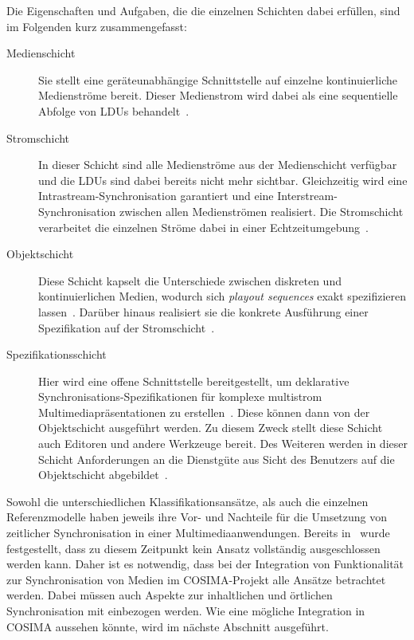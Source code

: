   Die Eigenschaften und Aufgaben, die die einzelnen Schichten dabei erfüllen, sind im Folgenden kurz zusammengefasst:
  
  \begin{description}
    \item[Medienschicht] Sie stellt eine geräteunabhängige Schnittstelle auf einzelne kontinuierliche Medienströme bereit. Dieser Medienstrom wird dabei als eine sequentielle Abfolge von LDUs behandelt~\citep[S. 603]{multimedia_technologie}.
    \item[Stromschicht] In dieser Schicht sind alle Medienströme aus der Medienschicht verfügbar und die LDUs sind dabei bereits nicht mehr sichtbar. Gleichzeitig wird eine Intrastream-Synchronisation garantiert und eine Interstream-Synchronisation zwischen allen Medienströmen realisiert. Die Stromschicht verarbeitet die einzelnen Ströme dabei in einer Echtzeitumgebung~\citep[S. 604]{multimedia_technologie}.
    \item[Objektschicht] Diese Schicht kapselt die Unterschiede zwischen diskreten und kontinuierlichen Medien, wodurch sich \emph{playout sequences} exakt spezifizieren lassen~\citep[S. 99]{meyer1993tms}. Darüber hinaus realisiert sie die konkrete Ausführung einer Spezifikation auf der Stromschicht~\citep[S. 605]{multimedia_technologie}.
    \item[Spezifikationsschicht] Hier wird eine offene Schnittstelle bereitgestellt, um deklarative Synchronisations-Spezifikationen für komplexe multistrom Multimediapräsentationen zu erstellen~\citep[S. 13]{blakowski1996mss}. Diese können dann von der Objektschicht ausgeführt werden. Zu diesem Zweck stellt diese Schicht auch Editoren und andere Werkzeuge bereit. Des Weiteren werden in dieser Schicht Anforderungen an die Dienstgüte aus Sicht des Benutzers auf die Objektschicht abgebildet~\citep[S. 607]{multimedia_technologie}.
  \end{description}
  

  Sowohl die unterschiedlichen Klassifikationsansätze, als auch die einzelnen Referenzmodelle haben jeweils ihre Vor- und Nachteile für die Umsetzung von zeitlicher Synchronisation in einer Multimediaanwendungen. Bereits in~\citep[S. 28ff]{bericht} wurde festgestellt, dass zu diesem Zeitpunkt kein Ansatz vollständig ausgeschlossen werden kann. Daher ist es notwendig, dass bei der Integration von Funktionalität zur Synchronisation von Medien im COSIMA-Projekt alle Ansätze betrachtet werden. Dabei müssen auch Aspekte zur inhaltlichen und örtlichen Synchronisation mit einbezogen werden. Wie eine mögliche Integration in COSIMA aussehen könnte, wird im nächste Abschnitt ausgeführt.

